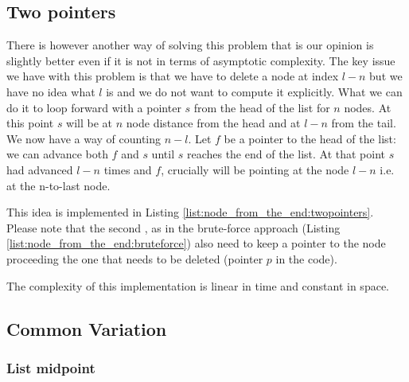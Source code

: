 

\subsection{Two pointers}
\label{node_from_the_end:sec:twopointers}
There is however another way of solving this problem that is our opinion is slightly better even if it is not in terms of asymptotic complexity. 
The key issue we have with this problem is that we have to delete a node at index $l-n$ but we have no idea what $l$ is and we do not want to compute it explicitly. 
What we can do it to loop forward with a pointer $s$ from the head of the list for $n$ nodes. At this point $s$ will be at $n$ node distance from the head and at $l-n$ from the tail. We now have a way of counting $n-l$. Let $f$ be a pointer to the head of the list: we can advance both $f$ and $s$ until $s$ reaches the end of the list. At that point $s$ had advanced $l-n$ times and $f$, crucially will be pointing at the node $l-n$ i.e. at the n-to-last node.

This idea is implemented in Listing \ref{list:node_from_the_end:twopointers}. Please note that the second , as in the brute-force approach (Listing \ref{list:node_from_the_end:bruteforce}) also need to keep a pointer to the node proceeding the one that needs to be deleted (pointer $p$ in the code).

The complexity of this implementation is linear in time and constant in space.




\subsection{Common Variation}
\subsubsection{List midpoint}
\label{node_from_the_end:sec:list_midpoint}


